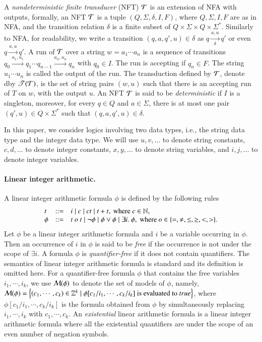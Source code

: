 A \emph{nondeterministic finite transducer} (NFT) $\mathcal{T}$ is an extension of NFA with outputs, formally, an NFT $\mathcal{T}$ is a tuple $(Q, \Sigma, \delta, I, F)$, where $Q, \Sigma, I, F$ are as in NFA, and the transition relation $\delta$ is a finite subset of $Q \times \Sigma \times Q \times \Sigma^*$. Similarly to NFA, for readability, we write a transition $(q, a, q', u) \in \delta$ as $q \xrightarrow[\delta]{a, u} q'$ or even $q \xrightarrow{a, u} q'$. 
%
A run of $\mathcal{T}$ over a string $w=a_1 \cdots a_n$ is a sequence of transitions $q_0 \xrightarrow{a_1, u_1} q_1 \cdots q_{n-1} \xrightarrow{a_n, u_n} q_n$ with $q_0 \in I$. The run is accepting if $q_n \in F$. The string $u_1 \cdots u_n$ is called the output of the run. The transduction defined by $\mathcal{T}$, denote dby $\mathscr{T}(\mathcal{T})$, is the set of string pairs $(w, u)$ such that there is an accepting run of $T$ on $w$, with the output $u$. An NFT $\mathcal{T}$ is said to be \emph{deterministic} if $I$ is a singleton, moreover, for every $q \in Q$ and $a \in \Sigma$, there is at most one pair $(q', u) \in Q \times \Sigma^*$ such that $(q, a, q', u) \in \delta$.


\medskip

In this paper, we consider logics involving two data types, i.e., the string data type and the integer data type. We will use $u, v, \dots$ to denote string constants,  $c, d,\dots$ to denote integer constants, $x, y, \dots$ to denote string variables, and $i, j, \dots$ to denote  integer variables.


\paragraph*{Linear integer arithmetic.}  A linear integer arithmetic formula $\phi$ is defined by the following rules
\[
\begin{array}{l c l}
t & ::=  & i \mid c \mid ct \mid t + t, \mbox{ where } c \in \mathbb{N}, \\
\phi &::= & t \ o \ t \mid \neg \phi \mid \phi \vee \phi \mid \exists i.\ \phi, \mbox{ where } o \in \{=, \neq, \le, \ge, <, >\}.
\end{array}
\]
Let $\phi$ be a linear integer arithmetic formula and $i$ be a variable occurring in $\phi$. Then an occurrence of $i$ in $\phi$ is said to be \emph{free}  if the occurrence is not under the scope of $\exists i$. A formula $\phi$ is \emph{quantifier-free} if it does not contain quantifiers. The semantics of linear integer arithmetic formula is standard and its definition is omitted here.
For a quantifier-free formula $\phi$ that contains the free variables $i_1, \cdots, i_k$, we use $\mathcal{M}(\phi)$ to denote the set of models of $\phi$, namely, $\mathcal{M}(\phi) = \left\{(c_1, \cdots ,c_k) \in \mathbb{Z}^k \mid \phi[c_1/i_1, \cdots, c_k/i_k] \mbox{ is evaluated to } true\right\}$, where $\phi[c_1/i_1, \cdots, c_k/i_k]$ is the formula obtained from $\phi$ by simultaneously replacing $i_1,\cdots, i_k$ with $c_1,\cdots, c_k$. An \emph{existential} linear arithmetic formula is a linear integer arithmetic formula where all the existential quantifiers are under the scope of an even number of negation symbols.
